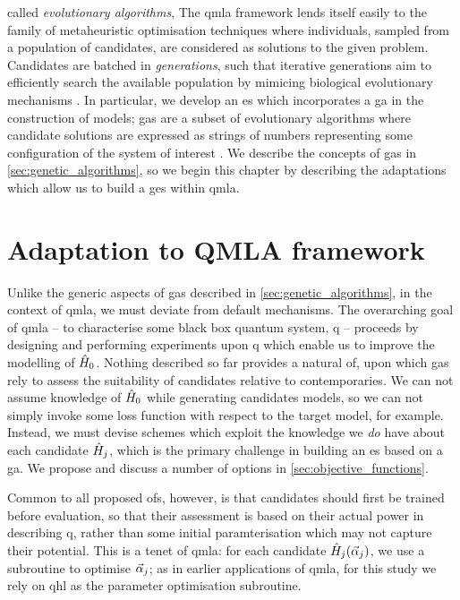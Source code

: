 
called \emph{evolutionary algorithms}, 
The \gls{qmla} framework lends itself easily to the family of metaheuristic optimisation techniques 
    where individuals, sampled from a population of candidates, are considered as solutions to the given problem.
Candidates are batched in \emph{generations},
    such that iterative generations aim to efficiently search the available population
    by mimicing biological evolutionary mechanisms \cite{back1996evolutionary}. 
In particular, we develop an \gls{es} which incorporates a \gls{ga} in the construction of models;
    \glspl{ga} are a subset of evolutionary algorithms where candidate solutions are expressed as 
    strings of numbers representing some configuration of the system of interest \cite{holland1992adaptation}.
We describe the concepts of \glspl{ga} in \cref{sec:genetic_algorithms}, 
    so we begin this chapter by describing the adaptations which allow us to build a \gls{ges} within \gls{qmla}. 
\par 

\section{Adaptation to QMLA framework}\label{sec:ga_adaptation_to_qmla}
Unlike the generic aspects of \glspl{ga} described in \cref{sec:genetic_algorithms}, 
    in the context of \gls{qmla}, we must deviate from default mechanisms. 
The overarching goal of \gls{qmla} --
    to characterise some black box quantum system, \gls{q} --
    proceeds by designing and performing \glspl{experiment} upon \gls{q} which enable us to improve 
    the modelling of $\hat{H}_0$. 
Nothing described so far provides a natural \gls{of}, upon which \glspl{ga} rely 
    to assess the suitability of candidates relative to contemporaries.
We can not assume knowledge of $\hat{H}_0$ while generating candidates \glspl{model},
    so we can not simply invoke some loss function with respect to the target model, for example. 
Instead, we must devise schemes which exploit the knowledge we \emph{do} have about each candidate $\hat{H}_j$, 
    which is the primary challenge in building an \gls{es} based on a \gls{ga}.  
We propose and discuss a number of options in \cref{sec:objective_functions}. 
\par 

Common to all proposed \glspl{of}, however, is that candidates should first be trained before evaluation, 
    so that their assessment is based on their actual power in describing \gls{q},  
    rather than some initial paramterisation which may not capture their potential. 
This is a tenet of \gls{qmla}: for each candidate $\hat{H}_j ( \vec{\alpha}_j )$, we use a subroutine to optimise $\vec{\alpha}_j$;
    as in earlier applications of \gls{qmla}, for this study we rely on \gls{qhl} as the parameter optimisation subroutine. 
\par

